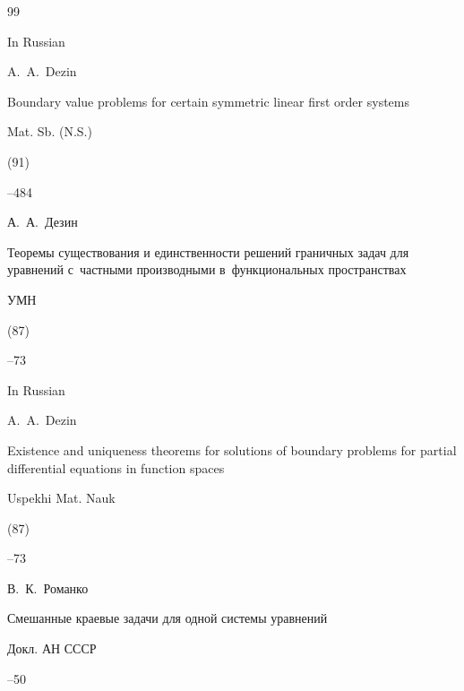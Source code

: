 \begin{thebibliography}{99}
\misctransl

\lang In Russian

\by A.~A.~Dezin

\paper Boundary value problems for certain symmetric linear first order systems

\jour Mat. Sb. (N.S.)


(91)


--484




\by А.~А.~Дезин

\paper Теоремы существования и единственности решений граничных задач для уравнений с~частными производными в~функциональных пространствах

\jour УМН



(87)

--73




\misctransl

\lang In Russian

\by A.~A.~Dezin

\paper Existence and uniqueness theorems for solutions of boundary problems for partial differential equations in function spaces

\jour Uspekhi Mat. Nauk



(87)

--73




\by В.~К.~Романко

\paper Смешанные краевые задачи для одной системы уравнений

\jour Докл. АН СССР




--50



\end{thebibliography}
